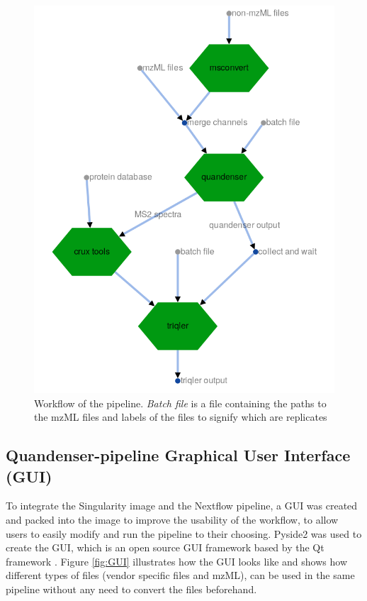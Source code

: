 \begin{figure}[H]
  \centering
  \includegraphics[width=\linewidth]{pictures/workflow.png}
  \caption{Workflow of the pipeline. \textit{Batch file} is a file containing the paths to the mzML files and labels of the files to signify which are replicates}
  \label{fig:workflow}
\end{figure}

\subsection{Quandenser-pipeline Graphical User Interface (GUI)}
To integrate the Singularity image and the Nextflow pipeline, a GUI was created and packed into the image to improve the usability of the workflow, to allow users to easily modify and run the pipeline to their choosing. Pyside2 was used to create the GUI, which is an open source GUI framework based by the Qt framework \cite{pyside2}. Figure \ref{fig:GUI} illustrates how the GUI looks like and shows how different types of files (vendor specific files and mzML), can be used in the same pipeline without any need to convert the files beforehand.

